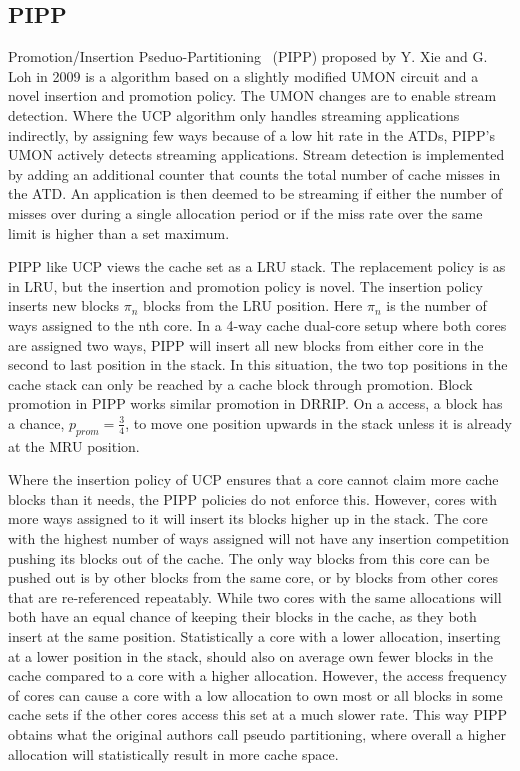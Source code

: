 
\subsection{PIPP}
\label{sec:background:algorithms:pipp}

Promotion/Insertion Pseduo-Partitioning~\cite{Xie2009} (PIPP) proposed by Y. Xie and G. Loh in 2009 is a algorithm based on a slightly modified UMON circuit and a novel insertion and promotion policy.
The UMON changes are to enable stream detection.
Where the UCP algorithm only handles streaming applications indirectly, by assigning few ways because of a low hit rate in the ATDs, PIPP's UMON actively detects streaming applications.
Stream detection is implemented by adding an additional counter that counts the total number of cache misses in the ATD.
An application is then deemed to be streaming if either the number of misses over during a single allocation period or if the miss rate over the same limit is higher than a set maximum.

PIPP like UCP views the cache set as a LRU stack.
The replacement policy is as in LRU, but the insertion and promotion policy is novel.
The insertion policy inserts new blocks $\pi_n$ blocks from the LRU position. 
Here $\pi_n$ is the number of ways assigned to the nth core.
In a 4-way cache dual-core setup where both cores are assigned two ways, PIPP will insert all new blocks from either core in the second to last position in the stack. 
In this situation, the two top positions in the cache stack can only be reached by a cache block through promotion.
Block promotion in PIPP works similar promotion in DRRIP. 
On a access, a block has a chance, $p_{prom} = \frac{3}{4}$, to move one position upwards in the stack unless it is already at the MRU position.

Where the insertion policy of UCP ensures that a core cannot claim more cache blocks than it needs, the PIPP policies do not enforce this.
However, cores with more ways assigned to it will insert its blocks higher up in the stack. 
The core with the highest number of ways assigned will not have any insertion competition pushing its blocks out of the cache.
The only way blocks from this core can be pushed out is by other blocks from the same core, or by blocks from other cores that are re-referenced repeatably.
While two cores with the same allocations will both have an equal chance of keeping their blocks in the cache, as they both insert at the same position.
Statistically a core with a lower allocation, inserting at a lower position in the stack, should also on average own fewer blocks in the cache compared to a core with a higher allocation.
However, the access frequency of cores can cause a core with a low allocation to own most or all blocks in some cache sets if the other cores access this set at a much slower rate.
This way PIPP obtains what the original authors call pseudo partitioning, where overall a higher allocation will statistically result in more cache space.

